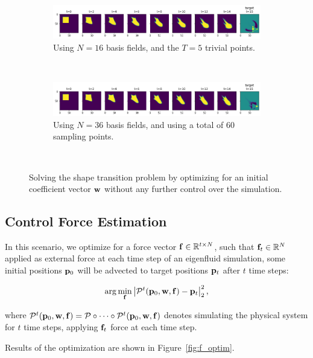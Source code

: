 \begin{figure}
\begin{subfigure}{\textwidth}
    \centering
    \includegraphics[width=\textwidth]{figures/points-velocity-only/T5/trajectory_horizontal.png}
    \caption{Using $N=16$ basis fields, and the $T=5$ trivial points.}
    \label{fig:points-vel-only-small}
  \end{subfigure}\\
  \begin{subfigure}{\textwidth}
    \centering
    \includegraphics[width=\textwidth]{figures/points-velocity-only/O30_U30_T0/trajectory_horizontal.png}
    \caption{Using $N=36$ basis fields, and using a total of $60$ sampling
    points.}
    \label{fig:points-vel-only-big}
  \end{subfigure}\\
  \caption{Solving the shape transition problem by optimizing for an initial
  coefficient vector $\vb{w}$ without any further control over the simulation.}
  \label{fig:points-vel-only}
\end{figure}

\subsection{Control Force Estimation}\label{section:cfe}
In this scenario, we optimize for a force vector $\vb{f} \in \mathbb{R}^{t\times
N}$, such that $\vb{f}_t \in \mathbb{R}^N$ applied as external force at each
time step of an eigenfluid simulation, some initial positions $\vb{p}_0$ will be
advected to target positions $\vb{p}_t$ after $t$ time steps:

$$\arg\min_{\vb{f}} \left| \mathcal{P}^{t}(\vb{p}_0, \vb{w}, \vb{f})
  - \vb{p}_t\right|_2^2,$$

where $\mathcal{P}^{t}(\vb{p}_0, \vb{w}, \vb{f}) = \mathcal{P} \circ \dots
\circ \mathcal{P}^{t}(\vb{p}_0, \vb{w}, \vb{f})$ denotes simulating the
physical system for $t$ time steps, applying $\vb{f}_t$ force at each
time step.

Results of the optimization are shown in Figure~\ref{fig:f_optim}.

